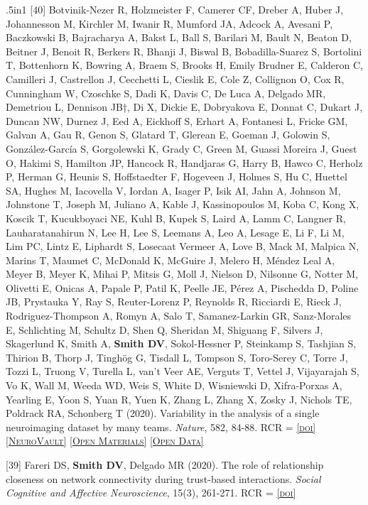 \documentclass[11pt, letterpaper]{article}
\newcommand{\doi}[1]{\href{#1}{\scriptsize\textsc{[doi]}}} %
\newcommand{\neurovault}[1]{\href{#1}{\scriptsize\textsc{[NeuroVault]}}}
\newcommand{\materials}[1]{\href{#1}{\scriptsize\textsc{[Open Materials]}}}
\newcommand{\data}[1]{\href{#1}{\scriptsize\textsc{[Open Data]}}}
\begin{document}
\begin{hangparas}{.5in}{1}
[40] Botvinik-Nezer R, Holzmeister F, Camerer CF, Dreber A, Huber J, Johannesson M, Kirchler M, Iwanir R, Mumford JA, Adcock A, Avesani P, Baczkowski B, Bajracharya A, Bakst L, Ball S, Barilari M, Bault N, Beaton D, Beitner J, Benoit R, Berkers R, Bhanji J, Biswal B, Bobadilla-Suarez S, Bortolini T, Bottenhorn K, Bowring A, Braem S, Brooks H, Emily Brudner E, Calderon C, Camilleri J, Castrellon J, Cecchetti L, Cieslik E, Cole Z, Collignon O, Cox R, Cunningham W, Czoschke S, Dadi K, Davis C, De Luca A, Delgado MR, Demetriou L, Dennison JB†, Di X, Dickie E, Dobryakova E, Donnat C, Dukart J, Duncan NW, Durnez J, Eed A, Eickhoff S, Erhart A, Fontanesi L, Fricke GM, Galvan A, Gau R, Genon S, Glatard T, Glerean E, Goeman J,  Golowin S, González-García S, Gorgolewski K, Grady C, Green M, Guassi Moreira J, Guest O, Hakimi S, Hamilton JP, Hancock R, Handjaras G, Harry B, Hawco C, Herholz P, Herman G, Heunis S, Hoffstaedter F, Hogeveen J, Holmes S, Hu C, Huettel SA, Hughes M, Iacovella V, Iordan A, Isager P, Isik AI, Jahn A, Johnson M, Johnstone T, Joseph M, Juliano A, Kable J, Kassinopoulos M, Koba C, Kong X, Koscik T, Kucukboyaci NE, Kuhl B, Kupek S, Laird A, Lamm C, Langner R, Lauharatanahirun N, Lee H, Lee S, Leemans A, Leo A, Lesage E, Li F, Li M, Lim PC, Lintz E, Liphardt S, Losecaat Vermeer A, Love B, Mack M, Malpica N, Marins T, Maumet C, McDonald K, McGuire J, Melero H, Méndez Leal A, Meyer B, Meyer K, Mihai P, Mitsis G, Moll J, Nielson D, Nilsonne G, Notter M, Olivetti E, Onicas A, Papale P, Patil K, Peelle JE, Pérez A, Pischedda D, Poline JB, Prystauka Y, Ray S, Reuter-Lorenz P, Reynolds R, Ricciardi E, Rieck J, Rodriguez-Thompson A, Romyn A, Salo T, Samanez-Larkin GR, Sanz-Morales E, Schlichting M, Schultz D, Shen Q, Sheridan M, Shiguang F, Silvers J, Skagerlund K, Smith A, \textbf{Smith DV}, Sokol-Hessner P, Steinkamp S, Tashjian S, Thirion B, Thorp J, Tinghög G, Tisdall L, Tompson S, Toro-Serey C, Torre J, Tozzi L, Truong V, Turella L, van’t Veer AE, Verguts T, Vettel J, Vijayarajah S, Vo K, Wall M, Weeda WD, Weis S, White D, Wisniewski D, Xifra-Porxas A, Yearling E, Yoon S, Yuan R, Yuen K, Zhang L, Zhang X, Zosky J, Nichols TE, Poldrack RA, Schonberg T (2020). Variability in the analysis of a single neuroimaging dataset by many teams. \textit{Nature}, 582, 84-88. RCR =  \doi{https://doi.org/10.1038/s41586-020-2314-9} \neurovault{https://neurovault.org/collections/6047/} \materials{https://github.com/poldrack/narps} \data{https://openneuro.org/datasets/ds001734/versions/1.0.4} 

[39] Fareri DS, \textbf{Smith DV}, Delgado MR (2020). The role of relationship closeness on network connectivity during trust-based interactions. \textit{Social Cognitive and Affective Neuroscience}, 15(3), 261-271. RCR =  \doi{https://doi.org/10.1093/scan/nsaa031} 


\end{hangparas}
\end{document}

